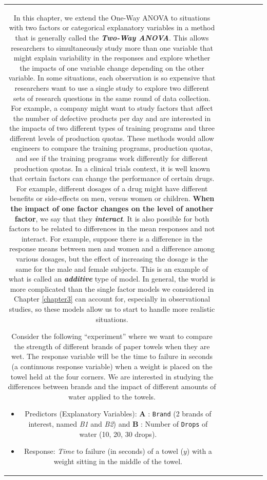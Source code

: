 \documentclass[]{book}
\theoremstyle{definition}
\theoremstyle{definition}
\theoremstyle{remark}
\begin{document}
\begin{longtable}[]{@{}ccccccc@{}}
\begin{minipage}[b]{0.10\columnwidth}
In this chapter, we extend the One-Way ANOVA to situations with two
factors or categorical explanatory variables in a method that is
generally called the \textbf{\emph{Two-Way ANOVA}}. This allows
researchers to simultaneously study more than one variable that might
explain variability in the responses and explore whether the impacts of
one variable change depending on the other variable. In some situations,
each observation is so expensive that researchers want to use a single
study to explore two different sets of research questions in the same
round of data collection. For example, a company might want to study
factors that affect the number of defective products per day and are
interested in the impacts of two different types of training programs
and three different levels of production quotas. These methods would
allow engineers to compare the training programs, production quotas, and
see if the training programs work differently for different production
quotas. In a clinical trials context, it is well known that certain
factors can change the performance of certain drugs. For example,
different dosages of a drug might have different benefits or
side-effects on men, versus women or children. \textbf{When the impact
of one factor changes on the level of another factor}, we say that they
\textbf{\emph{interact}}. It is also possible for both factors to be
related to differences in the mean responses and not interact. For
example, suppose there is a difference in the response means between men
and women and a difference among various dosages, but the effect of
increasing the dosage is the same for the male and female subjects. This
is an example of what is called an \textbf{\emph{additive}} type of
model. In general, the world is more complicated than the single factor
models we considered in Chapter \ref{chapter3} can account for,
especially in observational studies, so these models allow us to start
to handle more realistic situations.

Consider the following ``experiment'' where we want to compare the
strength of different brands of paper towels when they are wet. The
response variable will be the time to failure in seconds (a continuous
response variable) when a weight is placed on the towel held at the four
corners. We are interested in studying the differences between brands
and the impact of different amounts of water applied to the towels.

\begin{itemize}
\item
  Predictors (Explanatory Variables): \textbf{A} : \texttt{Brand} (2
  brands of interest, named \emph{B1} and \emph{B2}) and \textbf{B} :
  Number of \texttt{Drops} of water (10, 20, 30 drops).
\item
  Response: \emph{Time} to failure (in seconds) of a towel (\(y\)) with
  a weight sitting in the middle of the towel.
\end{itemize}


\end{minipage}
\end{longtable}
\end{document}
